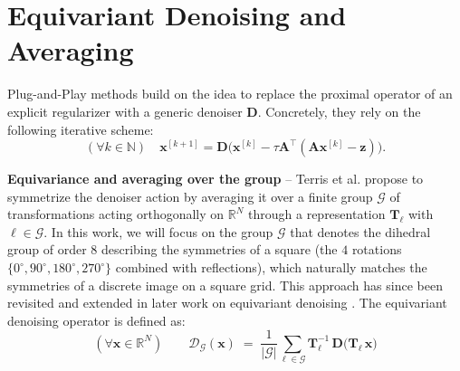 \documentclass{article}
\newcommand{\R}{\mathbb{R}}
\newcommand{\xb}{\mathbf{x}}
\newcommand{\Ab}{\mathbf{A}}
\newcommand{\zb}{\mathbf{z}}
\begin{document}
\section{Equivariant Denoising and  Averaging}
\label{sec:equivariant-pnp}

Plug-and-Play methods build on the idea to replace the proximal operator of an explicit regularizer with a generic denoiser $\mathbf{D}$. Concretely, they rely on the following iterative scheme:
%
\begin{equation}
\label{alg:pnp-base}
(\forall k\in\mathbb{N})\quad
\xb^{[k+1]} =  \mathbf{D}\big(\xb^{[k]} - \tau \Ab^\top (\Ab\xb^{[k]} - \zb)\big).
\end{equation}

%


\noindent \textbf{Equivariance and averaging over the group} -- Terris et al. \cite{Terris2024} propose to
symmetrize the denoiser action by averaging it over a finite group
$\mathcal{G}$ of transformations acting orthogonally on $\R^N$ through
a representation $\mathbf{T}_\ell$ with $\ell\in\mathcal{G}$. In this work, we will focus on the group $\mathcal{G}$ that denotes the dihedral group of order $8$
describing the symmetries of a square (the $4$ rotations
$\{0^\circ,90^\circ,180^\circ, 270^\circ\}$ combined with reflections),
which naturally matches the symmetries of a discrete image on a
square grid. This approach has since been revisited and extended in
later work on equivariant denoising \cite{renaud2026equivariant}. The
equivariant denoising operator is defined as:\vspace{-0.3cm}
\[
  (\forall \xb \in \R^N) \qquad \mathcal{D}_\mathcal{G}(\xb) \;=\; \frac{1}{|\mathcal{G}|}\sum_{\ell \in \mathcal{G}}
  \mathbf{T}_\ell^{-1}\, \mathbf{D}\big(\mathbf{T}_\ell\, \xb\big)
\]\vspace{-0.5cm}
\end{document}
